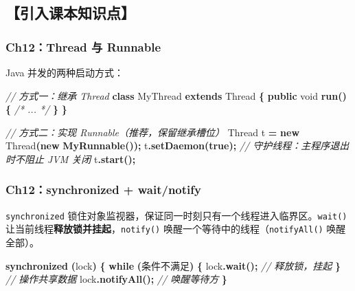 \documentclass[
  11pt,
]{ctexart}
\newenvironment{Shaded}{\begin{snugshade}}{\end{snugshade}}
\newcommand{\BuiltInTok}[1]{#1}
\newcommand{\CommentTok}[1]{\textcolor[rgb]{0.56,0.35,0.01}{\textit{#1}}}
\newcommand{\ControlFlowTok}[1]{\textcolor[rgb]{0.13,0.29,0.53}{\textbf{#1}}}
\newcommand{\DataTypeTok}[1]{\textcolor[rgb]{0.13,0.29,0.53}{#1}}
\newcommand{\FunctionTok}[1]{\textcolor[rgb]{0.13,0.29,0.53}{\textbf{#1}}}
\newcommand{\KeywordTok}[1]{\textcolor[rgb]{0.13,0.29,0.53}{\textbf{#1}}}
\newcommand{\NormalTok}[1]{#1}
\newcommand{\OperatorTok}[1]{\textcolor[rgb]{0.81,0.36,0.00}{\textbf{#1}}}
\begin{document}
\hypertarget{ux5f15ux5165ux8bfeux672cux77e5ux8bc6ux70b9-4}{%
\subsection{【引入课本知识点】}\label{ux5f15ux5165ux8bfeux672cux77e5ux8bc6ux70b9-4}}

\hypertarget{ch12thread-ux4e0e-runnable}{%
\subsubsection{Ch12：Thread 与
Runnable}\label{ch12thread-ux4e0e-runnable}}

Java 并发的两种启动方式：

\begin{Shaded}
\begin{Highlighting}[]
\CommentTok{// 方式一：继承 Thread}
\KeywordTok{class}\NormalTok{ MyThread }\KeywordTok{extends} \BuiltInTok{Thread} \OperatorTok{\{}
    \KeywordTok{public} \DataTypeTok{void} \FunctionTok{run}\OperatorTok{()} \OperatorTok{\{} \CommentTok{/* ... */} \OperatorTok{\}}
\OperatorTok{\}}

\CommentTok{// 方式二：实现 Runnable（推荐，保留继承槽位）}
\BuiltInTok{Thread}\NormalTok{ t }\OperatorTok{=} \KeywordTok{new} \BuiltInTok{Thread}\OperatorTok{(}\KeywordTok{new} \FunctionTok{MyRunnable}\OperatorTok{());}
\NormalTok{t}\OperatorTok{.}\FunctionTok{setDaemon}\OperatorTok{(}\KeywordTok{true}\OperatorTok{);} \CommentTok{// 守护线程：主程序退出时不阻止 JVM 关闭}
\NormalTok{t}\OperatorTok{.}\FunctionTok{start}\OperatorTok{();}
\end{Highlighting}
\end{Shaded}

\hypertarget{ch12synchronized-waitnotify}{%
\subsubsection{Ch12：synchronized +
wait/notify}\label{ch12synchronized-waitnotify}}

\texttt{synchronized}
锁住对象监视器，保证同一时刻只有一个线程进入临界区。\texttt{wait()}
让当前线程\textbf{释放锁并挂起}，\texttt{notify()}
唤醒一个等待中的线程（\texttt{notifyAll()} 唤醒全部）。

\begin{Shaded}
\begin{Highlighting}[]
\KeywordTok{synchronized} \OperatorTok{(}\NormalTok{lock}\OperatorTok{)} \OperatorTok{\{}
    \ControlFlowTok{while} \OperatorTok{(}\NormalTok{条件不满足}\OperatorTok{)} \OperatorTok{\{}
\NormalTok{        lock}\OperatorTok{.}\FunctionTok{wait}\OperatorTok{();}   \CommentTok{// 释放锁，挂起}
    \OperatorTok{\}}
    \CommentTok{// 操作共享数据}
\NormalTok{    lock}\OperatorTok{.}\FunctionTok{notifyAll}\OperatorTok{();} \CommentTok{// 唤醒等待方}
\OperatorTok{\}}
\end{Highlighting}
\end{Shaded}
\end{document}
